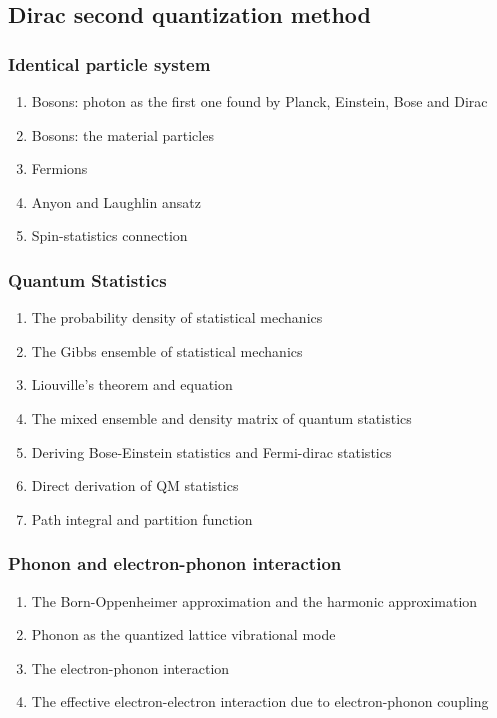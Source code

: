 \documentclass[12pt]{article}
\numberwithin{equation}{section}
\begin{document}
\subsection{Dirac second quantization method}
\subsubsection{Identical particle system}
\begin{enumerate}
\item Bosons: photon as the first one found by Planck, Einstein, Bose and Dirac
	
\item Bosons: the material particles
\item Fermions
\item Anyon and Laughlin ansatz
\item Spin-statistics connection
\end{enumerate}
\subsubsection{Quantum Statistics}
\begin{enumerate}
\item The probability density of statistical mechanics
\item The Gibbs ensemble of statistical mechanics
\item Liouville's theorem and equation
\item The mixed ensemble and density matrix of quantum statistics
\item Deriving Bose-Einstein statistics and Fermi-dirac statistics
\item Direct derivation of QM statistics
\item Path integral and partition function
\end{enumerate}
\subsubsection{Phonon and electron-phonon interaction}
\begin{enumerate}
\item The Born-Oppenheimer approximation and the harmonic approximation
\item Phonon as the quantized lattice vibrational mode
\item The electron-phonon interaction
\item The effective electron-electron interaction due to electron-phonon coupling
\end{enumerate}
\end{document}
